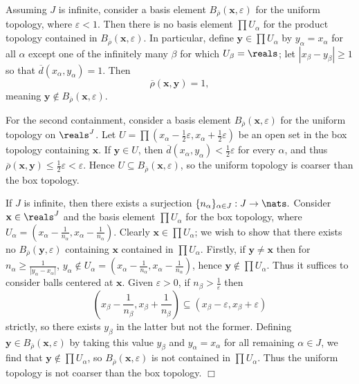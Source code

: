 Assuming $J$ is infinite, consider a basis element $B_{\overline{\rho}}(\mathbf{x}, \varepsilon)$ for the uniform topology, where $\varepsilon < 1$. Then there is no basis element $\prod U_\alpha$ for the product topology contained in $B_{\overline{\rho}}(\mathbf{x}, \varepsilon)$. In particular, define $\mathbf{y} \in \prod U_\alpha$ by $y_\alpha = x_\alpha$ for all $\alpha$ except one of the infinitely many $\beta$ for which $U_\beta = \reals$; let $|x_\beta - y_\beta| \geq 1$ so that $\overline{d}(x_\alpha, y_\alpha) = 1$. Then
$$\overline{\rho}(\mathbf{x}, \mathbf{y}) = 1,$$
meaning $\mathbf{y} \notin B_{\overline{\rho}}(\mathbf{x}, \varepsilon)$.

For the second containment, consider a basis element $B_{\overline{\rho}}(\mathbf{x}, \varepsilon)$ for the uniform topology on $\reals^J$. Let $U = \prod(x_\alpha - \frac12 \varepsilon, x_\alpha + \frac12 \varepsilon)$ be an open set in the box topology containing $\mathbf{x}$. If $\mathbf{y} \in U$, then $\overline{d}(x_\alpha, y_\alpha) < \frac12 \varepsilon$ for every $\alpha$, and thus $\overline{\rho}(\mathbf{x}, \mathbf{y}) \leq \frac12 \varepsilon < \varepsilon$. Hence $U \subseteq B_{\overline{\rho}}(\mathbf{x}, \varepsilon)$, so the uniform topology is coarser than the box topology.

If $J$ is infinite, then there exists a surjection $\{n_\alpha\}_{\alpha \in J}: J \rightarrow \nats.$ Consider $\mathbf{x} \in \reals^J$ and the basis element $\prod U_\alpha$ for the box topology, where $U_\alpha = (x_\alpha - \frac{1}{n_\alpha}, x_\alpha - \frac{1}{n_\alpha})$. Clearly $\mathbf{x} \in \prod U_\alpha$; we wish to show that there exists no $B_{\overline{\rho}}(\mathbf{y}, \varepsilon)$ containing $\mathbf{x}$ contained in $\prod U_\alpha$. Firstly, if $\mathbf{y} \neq \mathbf{x}$ then for $n_\alpha \geq \frac{1}{|y_\alpha - x_\alpha|}$, $y_\alpha \notin U_\alpha = (x_\alpha - \frac{1}{n_\alpha}, x_\alpha - \frac{1}{n_\alpha})$, hence $\mathbf{y} \notin \prod U_\alpha$. Thus it suffices to consider balls centered at $\mathbf{x}$. Given $\varepsilon > 0$, if $n_\beta > \frac{1}{\varepsilon}$ then 
$$(x_\beta - \frac{1}{n_\beta}, x_\beta + \frac{1}{n_\beta}) \subseteq (x_\beta - \varepsilon, x_\beta + \varepsilon)$$
strictly, so there exists $y_\beta$ in the latter but not the former. Defining $\mathbf{y} \in B_{\overline{\rho}}(\mathbf{x}, \varepsilon)$ by taking this value $y_\beta$ and $y_\alpha = x_\alpha$ for all remaining $\alpha \in J$, we find that $\mathbf{y} \notin \prod U_\alpha$, so $B_{\overline{\rho}}(\mathbf{x}, \varepsilon)$ is not contained in $\prod U_\alpha$. Thus the uniform topology is not coarser than the box topology. $\Box$

